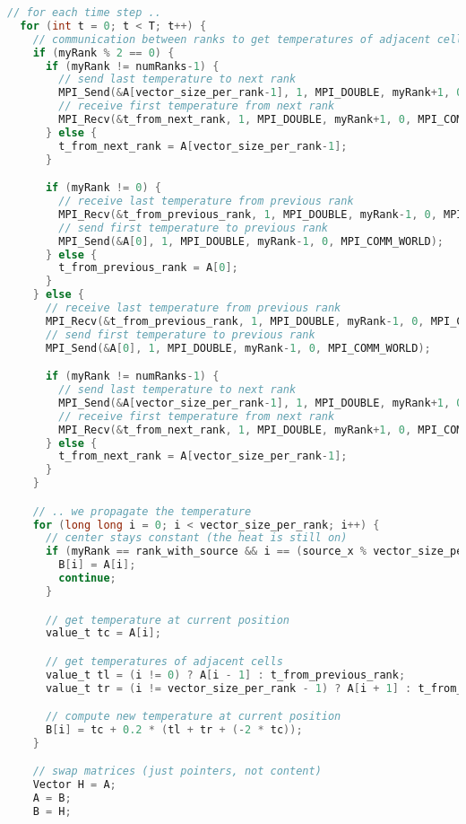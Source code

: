\documentclass[UTF-8]{article}
\begin{document}
\begin{itemize}
\begin{enumerate}[label=\textbf{\arabic *)}]
\begin{lstlisting}[language=c]
  // for each time step ..
  for (int t = 0; t < T; t++) {
    // communication between ranks to get temperatures of adjacent cells
    if (myRank % 2 == 0) {
      if (myRank != numRanks-1) {
        // send last temperature to next rank
        MPI_Send(&A[vector_size_per_rank-1], 1, MPI_DOUBLE, myRank+1, 0, MPI_COMM_WORLD);
        // receive first temperature from next rank
        MPI_Recv(&t_from_next_rank, 1, MPI_DOUBLE, myRank+1, 0, MPI_COMM_WORLD, MPI_STATUS_IGNORE);
      } else {
        t_from_next_rank = A[vector_size_per_rank-1];
      }

      if (myRank != 0) {
        // receive last temperature from previous rank
        MPI_Recv(&t_from_previous_rank, 1, MPI_DOUBLE, myRank-1, 0, MPI_COMM_WORLD, MPI_STATUS_IGNORE);
        // send first temperature to previous rank
        MPI_Send(&A[0], 1, MPI_DOUBLE, myRank-1, 0, MPI_COMM_WORLD);
      } else {
        t_from_previous_rank = A[0];
      }
    } else {
      // receive last temperature from previous rank
      MPI_Recv(&t_from_previous_rank, 1, MPI_DOUBLE, myRank-1, 0, MPI_COMM_WORLD, MPI_STATUS_IGNORE);
      // send first temperature to previous rank
      MPI_Send(&A[0], 1, MPI_DOUBLE, myRank-1, 0, MPI_COMM_WORLD);

      if (myRank != numRanks-1) {
        // send last temperature to next rank
        MPI_Send(&A[vector_size_per_rank-1], 1, MPI_DOUBLE, myRank+1, 0, MPI_COMM_WORLD);
        // receive first temperature from next rank
        MPI_Recv(&t_from_next_rank, 1, MPI_DOUBLE, myRank+1, 0, MPI_COMM_WORLD, MPI_STATUS_IGNORE);
      } else {
        t_from_next_rank = A[vector_size_per_rank-1];
      }
    }

    // .. we propagate the temperature
    for (long long i = 0; i < vector_size_per_rank; i++) {
      // center stays constant (the heat is still on)
      if (myRank == rank_with_source && i == (source_x % vector_size_per_rank)) {
        B[i] = A[i];
        continue;
      }

      // get temperature at current position
      value_t tc = A[i];

      // get temperatures of adjacent cells
      value_t tl = (i != 0) ? A[i - 1] : t_from_previous_rank;
      value_t tr = (i != vector_size_per_rank - 1) ? A[i + 1] : t_from_next_rank;

      // compute new temperature at current position
      B[i] = tc + 0.2 * (tl + tr + (-2 * tc));
    }

    // swap matrices (just pointers, not content)
    Vector H = A;
    A = B;
    B = H;


\end{lstlisting}
\end{enumerate}
\end{itemize}
\end{document}
